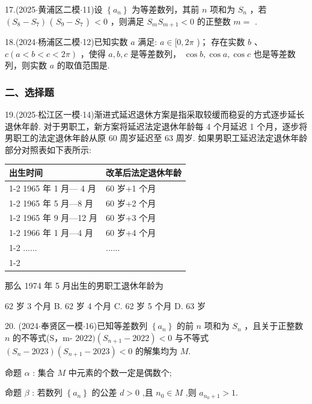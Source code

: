 17.(2025$\cdot$黄浦区二模$\cdot$11)设 $\left\{  {a}_{n}\right\}$ 为等差数列，其前 $n$ 项和为 ${S}_{n}$ ，若 $\left( {{S}_{8} - {S}_{7}}\right)$ ( ${S}_{9} - {S}_{7}$ ) $< 0$ ，则满足 ${S}_{m}{S}_{m + 1} < 0$ 的正整数 $m =$ \blkda[2]{}.

18.(2024$\cdot$杨浦区二模$\cdot$12)已知实数 $a$ 满足:   $a \in  \lbrack 0,{2\pi }$ )；   存在实数 $b$ 、 $c\left( {a < b < c < {2\pi }}\right)$ ，使得 $a,b,c$ 是等差数列， $\cos b,\cos a,\cos c$ 也是等差数列，则实数 $a$ 的取值范围是\blkda[2]{}.

\subsubsection*{二、选择题}

19.(2025$\cdot$松江区一模$\cdot$14)渐进式延迟退休方案是指采取较缓而稳妥的方式逐步延长退休年龄. 对于男职工，新方案将延迟法定退休年龄每 4 个月延迟 1 个月，逐步将男职工的法定退休年龄从原 60 周岁延迟至 63 周岁. 如果男职工延迟法定退休年龄部分对照表如下表所示:

\begin{center}

\begin{tabular}{|p{4cm}|p{12cm}|}
\hline
出生时间 & 改革后法定退休年龄 \\
\cline{1-2}
1965 年 1 月— 4 月 & 60 岁+1 个月 \\
\cline{1-2}
1965 年 5 月—8 月 & 60 岁+2 个月 \\
\cline{1-2}
1965 年 9 月—12 月 & 60 岁+3 个月 \\
\cline{1-2}
1966 年 1 月—4 月 & 60 岁+4 个月 \\
\cline{1-2}
...... &...... \\
\cline{1-2}
\hline
\end{tabular}
\end{center}

那么 1974 年 5 月出生的男职工退休年龄为 \dotfill{(\kh{})}

\xx{}{}{}{}62 岁 3 个月 B. 62 岁 4 个月 C. 62 岁 5 个月 D. 63 岁

20. (2024$\cdot$奉贤区一模$\cdot$16)已知等差数列 $\left\{  {a}_{n}\right\}$ 的前 $n$ 项和为 ${S}_{n}$ ，且关于正整数 $n$ 的不等式(S，m- ${2022})\left( {{S}_{n + 1} - {2022}}\right)  < 0$ 与不等式 $\left( {{S}_{n} - {2023}}\right) \left( {{S}_{n + 1} - {2023}}\right)  < 0$ 的解集均为 $M$.

命题 $\alpha$ : 集合 $M$ 中元素的个数一定是偶数个;

命题 $\beta$ : 若数列 $\left\{  {a}_{n}\right\}$ 的公差 $d > 0$ ,且 ${n}_{0} \in  M$ ,则 ${a}_{{n}_{0} + 1} > 1$.

